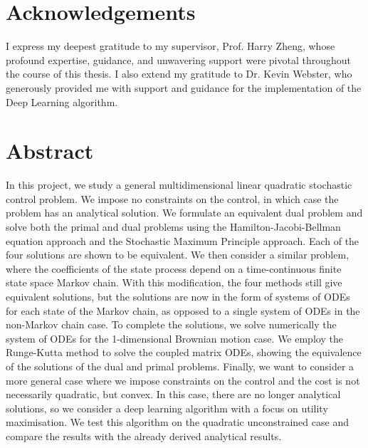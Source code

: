 \documentclass[10pt,a4paper]{report}
\begin{document}
\frontMatter


\clearpage

\section*{Acknowledgements}
\label{sec:ack}

I express my deepest gratitude to my supervisor, Prof. Harry Zheng, whose profound expertise, guidance, and unwavering support were pivotal throughout the course of this thesis. I also extend my gratitude to Dr. Kevin Webster, who generously provided me with support and guidance for the implementation of the Deep Learning algorithm.


\clearpage

\section*{Abstract}
\label{sec:abstract}
In this project, we study a general multidimensional linear quadratic stochastic control problem. We impose no constraints on the control, in which case the problem has an analytical solution. We formulate an equivalent dual problem and solve both the primal and dual problems using the Hamilton-Jacobi-Bellman equation approach and the Stochastic Maximum Principle approach. Each of the four solutions are shown to be equivalent. We then consider a similar problem, where the coefficients of the state process depend on a time-continuous finite state space Markov chain. With this modification, the four methods still give equivalent solutions, but the solutions are now in the form of systems of ODEs for each state of the Markov chain, as opposed to a single system of ODEs in the non-Markov chain case. To complete the solutions, we solve numerically the system of ODEs for the 1-dimensional Brownian motion case. We employ the Runge-Kutta method to solve the coupled matrix ODEs, showing the equivalence of the solutions of the dual and primal problems. Finally, we want to consider a more general case where we impose constraints on the control and the cost is not necessarily quadratic, but convex. In this case, there are no longer analytical solutions, so we consider a deep learning algorithm with a focus on utility maximisation. We test this algorithm on the quadratic unconstrained case and compare the results with the already derived analytical results.
\end{document}
